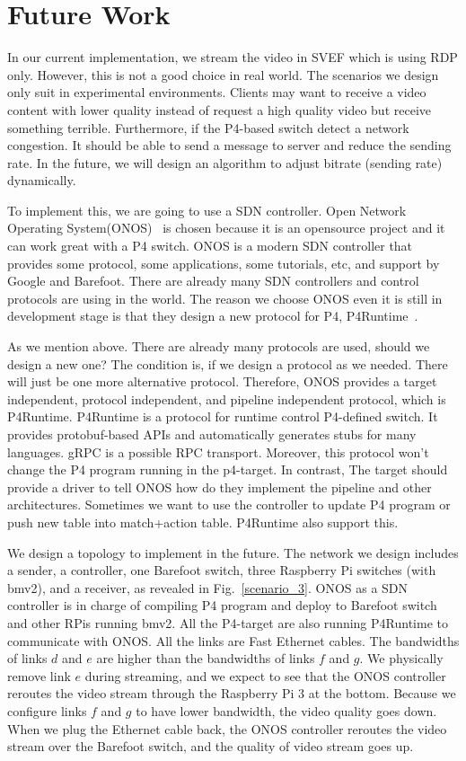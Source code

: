 \section{Future Work} \label{sec:futureWork}

In our current implementation, we stream the video in SVEF which is using RDP only. However, this is not a good choice in real world. The scenarios we design only suit in experimental environments. Clients may want to receive a video content with lower quality instead of request a high quality video but receive something terrible. Furthermore, if the P4-based switch detect a network congestion. It should be able to send a message to server and reduce the sending rate. In the future, we will design an algorithm to adjust bitrate (sending rate) dynamically.

To implement this, we are going to use a SDN controller. Open Network Operating System(ONOS)~\cite{berde2014onos} is chosen because it is an  opensource project and it can work great with a P4 switch. ONOS is a modern SDN controller that provides some protocol, some applications, some tutorials, etc, and support by Google and Barefoot. There are already many SDN controllers and control protocols are using in the world. The reason we choose ONOS even it is still in development stage is that they design a new protocol for P4, P4Runtime~\cite{P4Runtime}.

As we mention above. There are already many protocols are used, should we design a new one? The condition is, if we design a protocol as we needed. There will just be one more alternative protocol. Therefore, ONOS provides a target independent, protocol independent, and pipeline independent protocol, which is P4Runtime. P4Runtime is a protocol for runtime control P4-defined switch. It provides protobuf-based APIs and automatically generates stubs for many languages. gRPC is a possible RPC transport. Moreover, this protocol won't change the P4 program running in the p4-target. In contrast, The target should provide a driver to tell ONOS how do they implement the pipeline and other architectures. Sometimes we want to use the controller to update P4 program or push new table into match+action table. P4Runtime also support this.

We design a topology to implement in the future. The network we design includes a sender, a controller, one Barefoot switch, three Raspberry Pi switches (with bmv2), and a receiver, as revealed in Fig.~\ref{scenario_3}. ONOS as a SDN controller is in charge of compiling P4 program and deploy to Barefoot switch and other RPis running bmv2. All the P4-target are also running P4Runtime to communicate with ONOS. All the links are Fast Ethernet cables. The bandwidths of links $d$ and $e$ are higher than the bandwidths of links $f$ and $g$. We physically remove link $e$ during streaming, and we expect to see that the ONOS controller reroutes the video stream through the Raspberry Pi 3 at the bottom. Because we configure links  $f$ and $g$ to have lower bandwidth, the video quality goes down. When we plug the Ethernet cable back, the ONOS controller reroutes the video stream over the Barefoot switch, and the quality of video stream goes up. 

